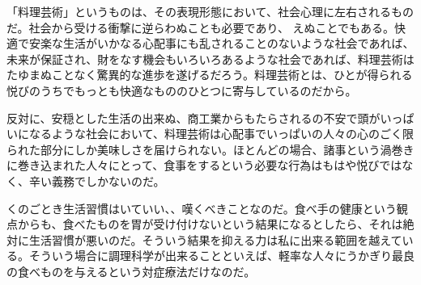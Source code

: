 「料理芸術」というものは、その表現形態において、社会心理に左右されるものだ。社会から受ける衝撃に逆らわぬことも必要であり、
えぬことでもある。快適で安楽な生活がいかなる心配事にも乱されることのないような社会であれば、未来が保証され、財をなす機会もいろいろあるような社会であれば、料理芸術はたゆまぬことなく驚異的な進歩を遂げるだろう。料理芸術とは、ひとが得られる悦びのうちでもっとも快適なもののひとつに寄与しているのだから。

反対に、安穏とした生活の出来ぬ、商工業からもたらされるの不安で頭がいっぱいになるような社会において、料理芸術は心配事でいっぱいの人々の心のごく限られた部分にしか美味しさを届けられない。ほとんどの場合、諸事という渦巻きに巻き込まれた人々にとって、食事をするという必要な行為はもはや悦びではなく、辛い義務でしかないのだ。

くのごとき生活習慣はいていい、、嘆くべきことなのだ。食べ手の健康という観点からも、食べたものを胃が受け付けないという結果になるとしたら、それは絶対に生活習慣が悪いのだ。そういう結果を抑える力は私に出来る範囲を越えている。そういう場合に調理科学が出来ることといえば、軽率な人々にうかぎり最良の食べものを与えるという対症療法だけなのだ。


